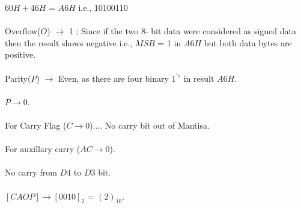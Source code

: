 \documentclass{article}
\begin{document}
\begin{enumerate}
 $60H + 46H$ = $A6H$ i.e., 10100110\\
\\

Overflow($O$) $\rightarrow$ 1 ; Since if the two 8- bit data were considered as signed data then the result shows negative i.e., $MSB$ = 1 in $A6H$ but both data bytes are positive.\\
\\
Parity($P$) $\rightarrow$ Even, as there are four binary $1^{'s}$ in result $A6H$.\\
\\
$P \rightarrow 0$.\\
\\
For Carry Flag ($C \rightarrow 0$).... No carry bit out of Mantisa.\\
\\
For auxillary carry ($AC \rightarrow 0$).\\
\\
No carry from $D4$ to $D3$ bit.\\
\\
$[CAOP] \rightarrow [0010]_{2}$ = $(2)_{10}$.\\
\\
\end{enumerate}
\end{document}
